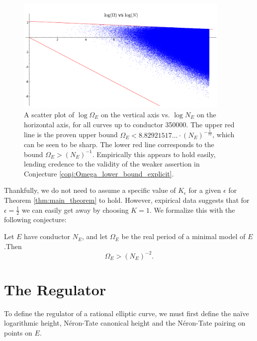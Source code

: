 \begin{figure}[!ht]
    \centering
    \includegraphics[width=0.92\textwidth]{graphics/real_periods_vs_conductors_loglog}
    \caption{A scatter plot of $\log \Omega_E $ on the vertical axis vs. $\log N_E$ on the horizontal axis, for all curves up to conductor 350000. The upper red line is the proven upper bound $\Omega_E < 8.82921517\ldots \cdot (N_E)^{-\frac{1}{12}}$, which can be seen to be sharp. The lower red line corresponds to the bound $\Omega_E > (N_E)^{-1}$. Empirically this appears to hold easily, lending credence to the validity of the weaker assertion in Conjecture \ref{conj:Omega_lower_bound_explicit}.}
    \label{fig:real_period_vs_conductor_loglog}
\end{figure}

Thankfully, we do not need to assume a specific value of $K_{\epsilon}$ for a given $\epsilon$ for Theorem \ref{thm:main_theorem} to hold. However, expirical data suggests that for $\epsilon=\frac{1}{2}$ we can easily get away by choosing $K = 1$. We formalize this with the following conjecture:
\begin{conjecture}\label{conj:Omega_lower_bound_explicit}
Let $E$ have conductor $N_E$, and let $\Omega_E$ be the real period of a minimal model of $E$.Then 
\begin{equation}
\Omega_E > (N_E)^{-2}.
\end{equation}
\end{conjecture}

\newpage
\section{The Regulator}

To define the regulator of a rational elliptic curve, we must first define the na\"ive logarithmic height, N\'eron-Tate canonical height and the N\'eron-Tate pairing on points on $E$. \\

